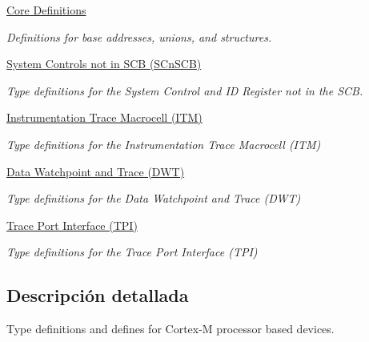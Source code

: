 \begin{DoxyCompactItemize}
\hyperlink{group___c_m_s_i_s__core__base}{Core Definitions}
\begin{DoxyCompactList}\small\item\em Definitions for base addresses, unions, and structures. \end{DoxyCompactList}\item 
\hyperlink{group___c_m_s_i_s___s_cn_s_c_b}{System Controls not in S\+C\+B (\+S\+Cn\+S\+C\+B)}
\begin{DoxyCompactList}\small\item\em Type definitions for the System Control and ID Register not in the S\+CB. \end{DoxyCompactList}\item 
\hyperlink{group___c_m_s_i_s___i_t_m}{Instrumentation Trace Macrocell (\+I\+T\+M)}
\begin{DoxyCompactList}\small\item\em Type definitions for the Instrumentation Trace Macrocell (I\+TM) \end{DoxyCompactList}\item 
\hyperlink{group___c_m_s_i_s___d_w_t}{Data Watchpoint and Trace (\+D\+W\+T)}
\begin{DoxyCompactList}\small\item\em Type definitions for the Data Watchpoint and Trace (D\+WT) \end{DoxyCompactList}\item 
\hyperlink{group___c_m_s_i_s___t_p_i}{Trace Port Interface (\+T\+P\+I)}
\begin{DoxyCompactList}\small\item\em Type definitions for the Trace Port Interface (T\+PI) \end{DoxyCompactList}\end{DoxyCompactItemize}


\subsection{Descripción detallada}
Type definitions and defines for Cortex-\/M processor based devices. 

